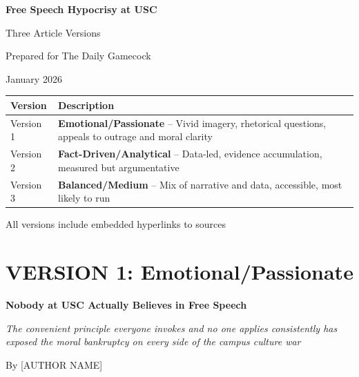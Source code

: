 \documentclass[11pt]{article}
\begin{document}
\begin{titlepage}
\centering
\vspace*{2cm}
{\Huge\bfseries Free Speech Hypocrisy at USC\par}
\vspace{0.5cm}
{\Large Three Article Versions\par}
\vspace{2cm}
{\large Prepared for The Daily Gamecock\par}
\vspace{0.5cm}
{\large January 2026\par}
\vspace{3cm}

\begin{tabular}{|l|p{8cm}|}
\hline
\textbf{Version} & \textbf{Description} \\
\hline
Version 1 & \textbf{Emotional/Passionate} -- Vivid imagery, rhetorical questions, appeals to outrage and moral clarity \\
\hline
Version 2 & \textbf{Fact-Driven/Analytical} -- Data-led, evidence accumulation, measured but argumentative \\
\hline
Version 3 & \textbf{Balanced/Medium} -- Mix of narrative and data, accessible, most likely to run \\
\hline
\end{tabular}

\vfill
{\small All versions include embedded hyperlinks to sources}
\end{titlepage}

\tableofcontents
\newpage


\section{VERSION 1: Emotional/Passionate}
\vspace{1cm}

{\LARGE\bfseries Nobody at USC Actually Believes in Free Speech}

\vspace{0.3cm}
{\large\textit{The convenient principle everyone invokes and no one applies consistently has exposed the moral bankruptcy on every side of the campus culture war}}

\vspace{0.3cm}
By [AUTHOR NAME]
\end{document}
